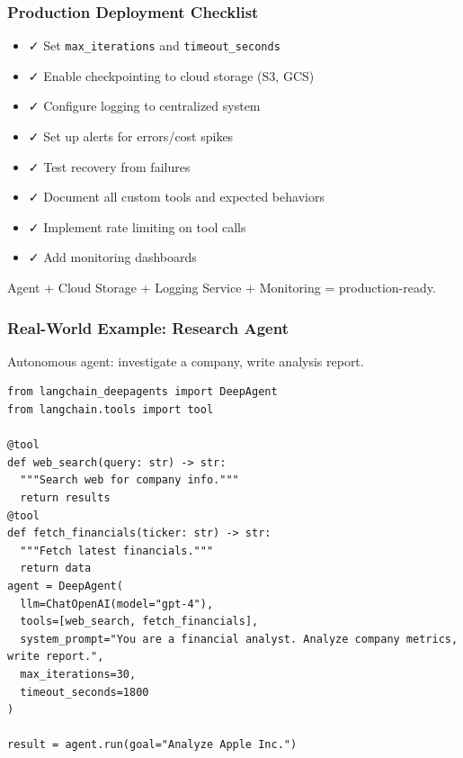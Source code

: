 \documentclass[aspectratio=169,11pt]{beamer}
\begin{document}
\begin{frame}[fragile]
\frametitle{Production Deployment Checklist}

\begin{conceptbox}
\begin{itemize}
    \setlength{\itemsep}{1pt}
  \item ✓ Set \texttt{max\_iterations} and \texttt{timeout\_seconds}
  \item ✓ Enable checkpointing to cloud storage (S3, GCS)
  \item ✓ Configure logging to centralized system
  \item ✓ Set up alerts for errors/cost spikes
  \item ✓ Test recovery from failures
  \item ✓ Document all custom tools and expected behaviors
  \item ✓ Implement rate limiting on tool calls
  \item ✓ Add monitoring dashboards
\end{itemize}
\end{conceptbox}

\begin{tipbox}
Agent + Cloud Storage + Logging Service + Monitoring = production-ready.
\end{tipbox}

\end{frame}

\begin{frame}[fragile]
\frametitle{Real-World Example: Research Agent}

\begin{conceptbox}[Goal]
Autonomous agent: investigate a company, write analysis report.
\end{conceptbox}

\begin{lstlisting}
from langchain_deepagents import DeepAgent
from langchain.tools import tool

@tool
def web_search(query: str) -> str:
  """Search web for company info."""
  return results
@tool
def fetch_financials(ticker: str) -> str:
  """Fetch latest financials."""
  return data
agent = DeepAgent(
  llm=ChatOpenAI(model="gpt-4"),
  tools=[web_search, fetch_financials],
  system_prompt="You are a financial analyst. Analyze company metrics, write report.",
  max_iterations=30,
  timeout_seconds=1800
)

result = agent.run(goal="Analyze Apple Inc.")
\end{lstlisting}

\end{frame}
\end{document}
